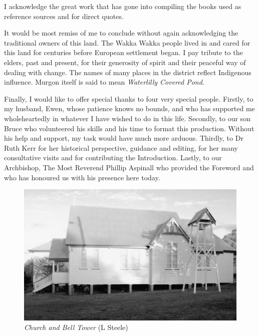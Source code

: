 I acknowledge the great work that has gone into compiling the books used as reference sources and for direct quotes.



It would be most remiss of me to conclude without again acknowledging the traditional owners of this land. The Wakka Wakka people lived in and cared for this land for centuries before European settlement began. I pay tribute to the elders, past and present, for their generosity of spirit and their peaceful way of dealing with change. The names of many places in the district reflect Indigenous influence. Murgon itself is said to mean \emph{Waterlilly Covered Pond}.



\balance


Finally, I would like to offer special thanks to four very special people. Firstly, to my husband, Ewen, whose patience knows no bounds, and who has supported me wholeheartedly in whatever I have wished to do in this life. Secondly, to our son Bruce who volunteered his skills and his time to format this production. Without his help and support, my task would have much more arduous. Thirdly, to Dr Ruth Kerr for her historical perspective, guidance and editing, for her many consultative visits and for contributing the Introduction. Lastly, to our Archbishop, The Most Reverend Phillip Aspinall who provided the Foreword and who has honoured us with his presence here today.









\begin{figure}[!htb]
\begin{center}
\includegraphics[width=1.\textwidth,center]{../images/churchAndBellTower.jpg}
\caption{{\itshape Church and Bell Tower} {\scriptsize(L Steele)}}
\end{center}
\end{figure}


